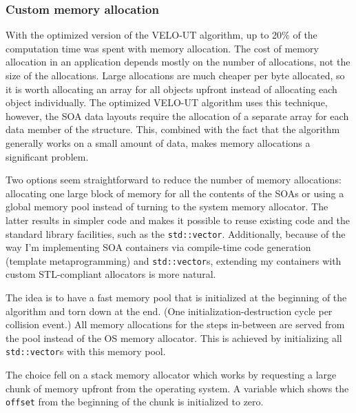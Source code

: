 \documentclass[12pt]{article}
\newcommand{\code}[1]{\texttt{#1}}
\begin{document}
\subsubsection{Custom memory allocation} \label{sec_velout_stack_alloc}

With the optimized version of the VELO-UT algorithm, up to 20\% of the computation time was spent with memory allocation. The cost of memory allocation in an application depends mostly on the number of allocations, not the size of the allocations. Large allocations are much cheaper per byte allocated, so it is worth allocating an array for all objects upfront instead of allocating each object individually. The optimized VELO-UT algorithm uses this technique, however, the SOA data layouts require the allocation of a separate array for each data member of the structure. This, combined with the fact that the algorithm generally works on a small amount of data, makes memory allocations a significant problem.

\vspace{1pc}

Two options seem straightforward to reduce the number of memory allocations: allocating one large block of memory for all the contents of the SOAs or using a global memory pool instead of turning to the system memory allocator. The latter results in simpler code and makes it possible to reuse existing code and the standard library facilities, such as the \code{std::vector}. Additionally, because of the way I'm implementing SOA containers via compile-time code generation (template metaprogramming) and \code{std::vector}s, extending my containers with custom STL-compliant allocators is more natural.

\vspace{1pc}

The idea is to have a fast memory pool that is initialized at the beginning of the algorithm and torn down at the end. (One initialization-destruction cycle per collision event.) All memory allocations for the steps in-between are served from the pool instead of the OS memory allocator. This is achieved by initializing all \code{std::vector}s with this memory pool.


\vspace{1pc}

The choice fell on a stack memory allocator which works by requesting a large chunk of memory upfront from the operating system. A variable which shows the \code{offset} from the beginning of the chunk is initialized to zero.
\end{document}
